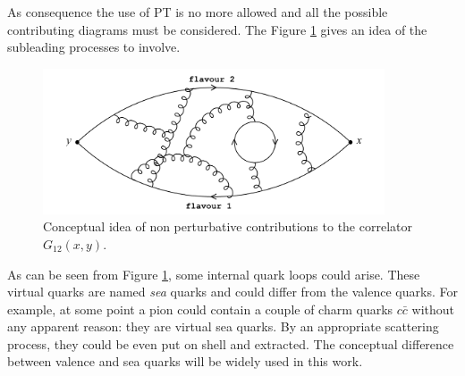 \documentclass[english, LaM, oneside, noexaminfo]{sapthesis}
\begin{document}
As consequence the use of PT is no more allowed and all the possible contributing diagrams must be considered.
The Figure \ref{fig:confinement} gives an idea of the subleading processes to involve.
\begin{figure}[h!]
    \centering
    \includegraphics[width=0.9\textwidth]{imgs-MSc-thesis/confinement.png}
    \caption{Conceptual idea of non perturbative contributions to the correlator $G_{12}(x,y)$.}
    \label{fig:confinement}
\end{figure}
\newline
As can be seen from Figure \ref{fig:confinement}, some internal quark loops could arise.
These virtual quarks are named {\it sea} quarks and could differ from the valence quarks.
For example, at some point a pion could contain a couple of charm quarks $c\bar c$ without any apparent reason: they are virtual sea quarks.
By an appropriate scattering process, they could be even put on shell and extracted.
The conceptual difference between valence and sea quarks will be widely used in this work.
\end{document}
